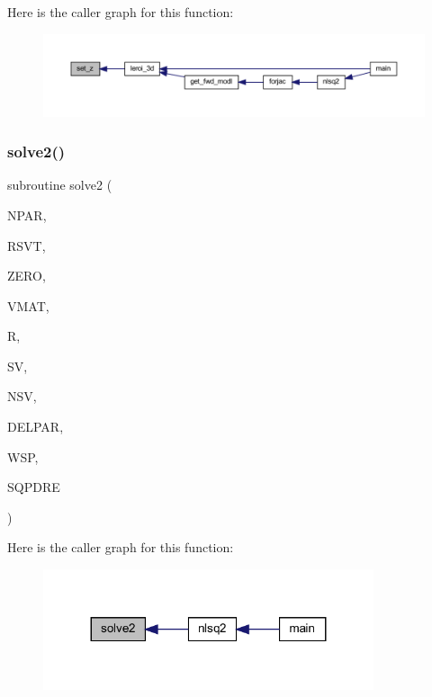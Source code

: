 Here is the caller graph for this function\+:\nopagebreak
\begin{figure}[H]
\begin{center}
\leavevmode
\includegraphics[width=350pt]{Leroi_8f90_aebaab3e30630bc52f3b79ccbc924f89c_icgraph}
\end{center}
\end{figure}
\mbox{\label{Leroi_8f90_a044a67601ecbe84bae3971c52173d8c1}} 
\subsubsection{\texorpdfstring{solve2()}{solve2()}}
{\footnotesize\ttfamily subroutine solve2 (\begin{DoxyParamCaption}\item[{integer, intent(in)}]{N\+P\+AR,  }\item[{real, intent(in)}]{R\+S\+VT,  }\item[{real, intent(in)}]{Z\+E\+RO,  }\item[{real, dimension(npar,npar), intent(in)}]{V\+M\+AT,  }\item[{real, dimension(npar), intent(in)}]{R,  }\item[{real, dimension(npar), intent(in)}]{SV,  }\item[{integer, intent(out)}]{N\+SV,  }\item[{real, dimension(npar), intent(out)}]{D\+E\+L\+P\+AR,  }\item[{real, dimension(3$\ast$npar), intent(out)}]{W\+SP,  }\item[{real, intent(out)}]{S\+Q\+P\+D\+RE }\end{DoxyParamCaption})}

Here is the caller graph for this function\+:\nopagebreak
\begin{figure}[H]
\begin{center}
\leavevmode
\includegraphics[width=275pt]{Leroi_8f90_a044a67601ecbe84bae3971c52173d8c1_icgraph}
\end{center}
\end{figure}
\mbox{\label{Leroi_8f90_a9459812f7e65c931ea1310423669f22a}} 
